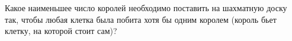 Какое наименьшее число королей необходимо поставить на шахматную доску так, чтобы любая клетка была побита хотя бы одним королем (король бьет клетку, на которой стоит сам)?